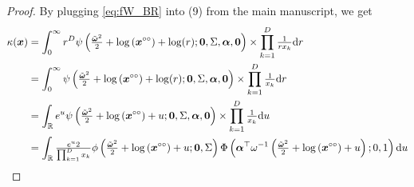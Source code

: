 \documentclass[lineno]{biometrika}
\begin{document}
\begin{proof}
By plugging \eqref{eq:fW_BR} into (9) from the main manuscript, we get
%
\begin{align*}
\kappa(\bm x) &= \int_0^\infty r^D \psi\left( {\textstyle{\tilde{\bm \omega}^2\over2}} + \log\left(\bm x^{\circ\circ}\right) + \log(r); \bm 0, \Sigma, \bm \alpha, \bm 0\right) \times \prod_{k=1}^D {\textstyle{1\over r x_k}} \text dr \\
&= \int_0^\infty \psi\left( {\textstyle{\tilde{\bm \omega}^2\over2}} + \log\left(\bm x^{\circ\circ}\right) + \log(r); \bm 0, \Sigma, \bm \alpha, \bm 0\right) \times \prod_{k=1}^D {\textstyle{1\over x_k}} \text dr \\
&= \int_{\mathbb{R}} e^{u} \psi\left( {\textstyle{\tilde{\bm \omega}^2\over2}} + \log\left(\bm x^{\circ\circ}\right) + u; \bm 0, \Sigma, \bm \alpha, \bm 0\right) \times \prod_{k=1}^D {\textstyle{1\over x_k}} \text du \\
&= \int_{\mathbb{R}} {\textstyle{e^{u} 2\over\prod_{k=1}^D x_k}} \phi\left( {\textstyle{\tilde{\bm \omega}^2\over2}} + \log\left(\bm x^{\circ\circ}\right) + u; \bm 0, \Sigma\right) \Phi\left( \bm \alpha^\top \omega^{-1} \left( {\textstyle{\tilde{\bm \omega}^2\over2}} + \log\left(\bm x^{\circ\circ}\right) + u \right); 0, 1\right) \text du \\
\end{align*}


\end{proof}
\end{document}
